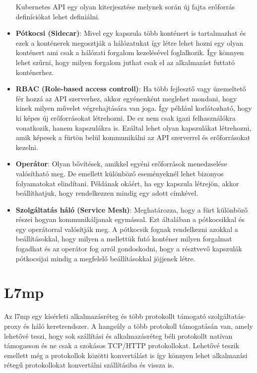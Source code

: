 \begin{itemize}
	Kubernetes API egy olyan kiterjesztése melynek során új fajta erőforrás definíciókat
	lehet definiálni. 
	\item \textbf{Pótkocsi (Sidecar)}: Mivel egy kapszula több konténert is tartalmazhat
	és ezek a konténerek megosztják a hálózatukat így létre lehet hozni egy olyan konténert
	ami csak a hálózati forgalom kezelésével foglalkozik. Így könnyen lehet szűrni, hogy
	milyen forgalom juthat csak el az alkalmazást futtató konténerhez. 
	\item \textbf{RBAC (Role-based access controll)}: Ha több fejlesztő vagy üzemeltető
	fér hozzá az API szerverhez, akkor egyénenként meglehet mondani, hogy kinek milyen 
	művelet végrehajtására van joga. Így például korlátozható, hogy ki képes új
	erőforrásokat létrehozni. De ez nem csak igazi felhasználókra vonatkozik, hanem
	kapszulákra is. Ezáltal lehet olyan kapszulákat létrehozni, amik képesek a fürtön
	belül kommunikálni az API szerverrel és erőforrásokat kezelni.  
	\item \textbf{Operátor}: Olyan bővítések, amikkel egyéni erőforrások menedzselése
	valósítható meg. De emellett különböző eseményeknél lehet bizonyos folyamatokat 
	elindítani. Példának okáért, ha egy kapszula létrejön, akkor beállíthatjuk, hogy
	rendelkezzen mindig egy adott címkével.
	\item \textbf{Szolgáltatás háló (Service Mesh)}: Meghatározza, hogy a fürt 
	különböző részei hogyan kommunikáljanak egymással. Ezt általában a pótkocsikkal és 
	egy operátorral valósítják meg. A pótkocsik fognak rendelkezni azokkal a beállításokkal,
	hogy milyen a mellettük futó konténer milyen forgalmat fogadhat és az operátor 
	fog arról gondoskodni, hogy a résztvevő kapszulák pótkocsijai mindig a megfelelő
	beállításokkal jöjjenek létre.
\end{itemize}

\section{L7mp}

Az l7mp egy kísérleti alkalmazásréteg és több protokollt támogató szolgáltatás- 
proxy és háló keretrendszer. A hangsúly a több protokoll támogatásán van, amely
lehetővé teszi, hogy sok szállítási és alkalmazásréteg béli protokollt 
natívan támogasson és ne csak a szokásos TCP/HTTP protokollokat. Lehetővé teszik 
emellett még a protokollok közötti konvertálást is így könnyen lehet alkalmazási
rétegű protokollokat konvertálni szállításiba és vissza is.

